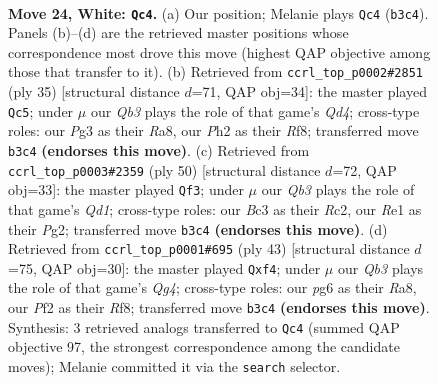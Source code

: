 \documentclass[11pt]{article}
\begin{document}
\clearpage

\begin{figure}[p]\centering
\begin{subfigure}{0.46\textwidth}\centering
\resizebox{\linewidth}{!}{%
\newchessgame
\chessboard[
  setfen={rnb3k1/1p2q2p/4r1p1/p3Np2/8/1QB1P1P1/P4PKP/1R2R3 w - - 2 24},
  showmover=false,
  pgfstyle=straightmove, color=movearrow, markmove={b3-c4}
]}
\caption{}
\end{subfigure}\hfill
\begin{subfigure}{0.46\textwidth}\centering
\resizebox{\linewidth}{!}{%
\newchessgame
\chessboard[
  setfen={r4rk1/1p3pp1/p1p1b2p/3q4/4P3/1P1B3P/P2Q1PPK/R3R3 b - - 0 18},
  showmover=false,
  pgfstyle=straightmove, color=movearrow, markmove={d5-c5}
]}
\caption{}
\end{subfigure}
\\[4pt]
\begin{subfigure}{0.46\textwidth}\centering
\resizebox{\linewidth}{!}{%
\newchessgame
\chessboard[
  setfen={r2r2k1/3nqpbp/6p1/pBp5/P3N2P/4P3/2R2PP1/3Q1RK1 w - - 1 26},
  showmover=false,
  pgfstyle=straightmove, color=movearrow, markmove={d1-f3}
]}
\caption{}
\end{subfigure}\hfill
\begin{subfigure}{0.46\textwidth}\centering
\resizebox{\linewidth}{!}{%
\newchessgame
\chessboard[
  setfen={r4rk1/1b3pp1/p3p3/6qp/2N2B2/5P1P/PP1RQ1P1/R5K1 b - - 0 22},
  showmover=false,
  pgfstyle=straightmove, color=movearrow, markmove={g5-f4}
]}
\caption{}
\end{subfigure}
\caption{\textbf{Move 24, White: \texttt{Qc4}.} (a) Our position; Melanie plays \texttt{Qc4} (\texttt{b3c4}). Panels (b)--(d) are the retrieved master positions whose correspondence most drove this move (highest QAP objective among those that transfer to it). (b) Retrieved from \texttt{ccrl\_top\_p0002\#2851} (ply 35) [structural distance $d$=71, QAP obj=34]: the master played \texttt{Qc5}; under $\mu$ our \emph{Qb3} plays the role of that game's \emph{Qd4}; cross-type roles: our \emph{P}g3 as their \emph{R}a8, our \emph{P}h2 as their \emph{R}f8; transferred move \texttt{b3c4} \textbf{(endorses this move)}. (c) Retrieved from \texttt{ccrl\_top\_p0003\#2359} (ply 50) [structural distance $d$=72, QAP obj=33]: the master played \texttt{Qf3}; under $\mu$ our \emph{Qb3} plays the role of that game's \emph{Qd1}; cross-type roles: our \emph{B}c3 as their \emph{R}c2, our \emph{R}e1 as their \emph{P}g2; transferred move \texttt{b3c4} \textbf{(endorses this move)}. (d) Retrieved from \texttt{ccrl\_top\_p0001\#695} (ply 43) [structural distance $d$=75, QAP obj=30]: the master played \texttt{Qxf4}; under $\mu$ our \emph{Qb3} plays the role of that game's \emph{Qg4}; cross-type roles: our \emph{p}g6 as their \emph{R}a8, our \emph{P}f2 as their \emph{R}f8; transferred move \texttt{b3c4} \textbf{(endorses this move)}. Synthesis: 3 retrieved analogs transferred to \texttt{Qc4} (summed QAP objective 97, the strongest correspondence among the candidate moves); Melanie committed it via the \texttt{search} selector.}
\label{fig:thought-m46}
\end{figure}
\end{document}

